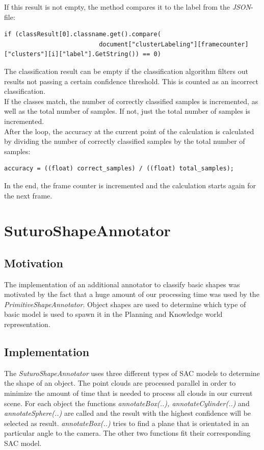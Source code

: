 \documentclass[main.tex]{subfiles}
\begin{document}
If this result is not empty, the method compares it to the label from the \textit{JSON}-file:

\begin{lstlisting}
if (classResult[0].classname.get().compare(
                          document["clusterLabeling"][framecounter]["clusters"][i]["label"].GetString()) == 0)
\end{lstlisting}

The classification result can be empty if the classification algorithm filters out results not passing a certain confidence threshold. This is counted as an incorrect classification.\\

If the classes match, the number of correctly classified samples is incremented, as well as the total number of samples. If not, just the total number of samples is incremented.\\

After the loop, the accuracy at the current point of the calculation is calculated by dividing the number of correctly classified samples by the total number of samples:

\begin{lstlisting}
accuracy = ((float) correct_samples) / ((float) total_samples);
\end{lstlisting}

In the end, the frame counter is incremented and the calculation starts again for the next frame.

\section{SuturoShapeAnnotator}

\subsection{Motivation}
The implementation of an additional annotator to classify basic shapes was motivated by the fact that a huge amount of our processing time
was used by the \textit{PrimitiveShapeAnnotator}. Object shapes are used to determine which type of basic model is used to spawn it in the Planning and Knowledge world representation.

\subsection{Implementation}
The \textit{SuturoShapeAnnotator} uses three different types of SAC models to determine the shape of an object.
The point clouds are processed parallel in order to minimize the amount of time that is needed to process all clouds in our current scene.
For each object the functions \textit{annotateBox(..), annotateCylinder(..)} and \textit{annotateSphere(..)} are called and the result with the highest confidence
will be selected as result. \textit{annotateBox(..)} tries to find a plane that is orientated in an particular angle to the camera. 
The other two functions fit their corresponding SAC model.
\end{document}
